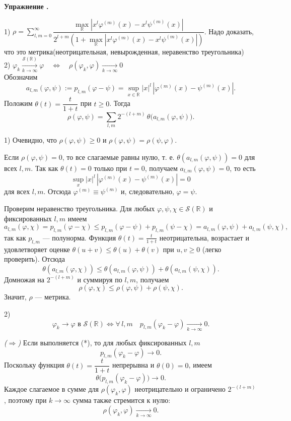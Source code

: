 \documentclass[11pt,a4paper]{report}
\numberwithin{equation}{section}
\numberwithin{figure}{chapter}
\numberwithin{table}{chapter}
\newif\ifinmathphysstatement
\newenvironment{myexe}[1][]{%
    \refstepcounter{exectr}%
    \inmathphysstatementtrue
    \begin{tcolorbox}[mathphysblock,colframe=exercisecolor,colback=exercisecolor!3,#1]
    \textbf{\color{exercisecolor}Упражнение \theexectr.}\par\smallskip
}{%
    \end{tcolorbox}
    \inmathphysstatementfalse
}
\newcommand{\R}{\mathbb{R}}
\newcommand{\SR}{\mathcal{S}(\R)}
\renewcommand{\phi}{\varphi}
\begin{document}
\begin{myexe} 
    1) $\rho=\displaystyle\sum\limits_{l,m=0}^{\infty}\dfrac{\underset{\R}{\max}|x^l\phi^{(m)}(x)-x^l\psi^{(m)}(x)|}{2^{l+m}(1+\underset{\R}{\max}|x^l\phi^{(m)}(x)-x^l\psi^{(m)}(x)|)}$. Надо доказать, что это метрика(неотрицательная, невырожденная, неравенство треугольника) \\
    2) $\phi_k\xrightarrow[k\to\infty]{\SR}\phi \quad \Leftrightarrow \quad \rho(\phi_k, \phi) \xrightarrow[k\to\infty]{}0$
\\
Обозначим
\[
a_{l,m}(\varphi,\psi)
:=p_{l,m}(\varphi-\psi)
=\sup_{x\in\mathbb R}|x|^l\,|\varphi^{(m)}(x)-\psi^{(m)}(x)|.
\]
Положим $\theta(t)=\dfrac{t}{1+t}$ при $t\ge0$.
Тогда
\[
\rho(\varphi,\psi)
=
\sum_{l,m}2^{-(l+m)}\,\theta\bigl(a_{l,m}(\varphi,\psi)\bigr).
\]

1)
Очевидно, что $\rho(\varphi,\psi)\ge0$ и
$\rho(\varphi,\psi)=\rho(\psi,\varphi)$.

Если $\rho(\varphi,\psi)=0$, то все слагаемые равны нулю, т. е.
$\theta(a_{l,m}(\varphi,\psi))=0$ для всех $l,m$. Так как $\theta(t)=0$
только при $t=0$, получаем $a_{l,m}(\varphi,\psi)=0$, то есть
\[
\sup_x |x|^l\,|\varphi^{(m)}(x)-\psi^{(m)}(x)|=0
\]
для всех $l,m$. Отсюда $\varphi^{(m)}\equiv\psi^{(m)}$ и, следовательно,
$\varphi=\psi$.

Проверим неравенство треугольника. Для любых
$\varphi,\psi,\chi\in \SR$ и фиксированных $l,m$ имеем
\[
a_{l,m}(\varphi,\chi)
=p_{l,m}(\varphi-\chi)
\le p_{l,m}(\varphi-\psi)+p_{l,m}(\psi-\chi)
=a_{l,m}(\varphi,\psi)+a_{l,m}(\psi,\chi),
\]
так как $p_{l,m}$ --- полунорма.
Функция $\theta(t)=\frac{t}{1+t}$ неотрицательна, возрастает и удовлетворяет
оценке $\theta(u+v)\le\theta(u)+\theta(v)$ при $u,v\ge0$ (легко проверить).
Отсюда
\[
\theta(a_{l,m}(\varphi,\chi))
\le
\theta(a_{l,m}(\varphi,\psi))
+
\theta(a_{l,m}(\psi,\chi)).
\]
Домножая на $2^{-(l+m)}$ и суммируя по $l,m$, получаем
\[
\rho(\varphi,\chi)\le\rho(\varphi,\psi)+\rho(\psi,\chi).
\]
Значит, $\rho$ --- метрика.

\medskip

2) 
\[
\varphi_k\to\varphi \text{ в } \SR
\iff
\forall\,l,m\quad p_{l,m}(\varphi_k-\varphi)\xrightarrow[k\to\infty]{}0.
\tag{*}
\]

\emph{($\Rightarrow$)} Если выполняется (*), то для любых фиксированных $l,m$
\[
p_{l,m}(\varphi_k-\varphi)\to0.
\]
Поскольку функция $\theta(t)=\dfrac{t}{1+t}$ непрерывна и $\theta(0)=0$,
имеем
\[
\theta\bigl(p_{l,m}(\varphi_k-\varphi)\bigr)\to0.
\]
Каждое слагаемое в сумме для $\rho(\varphi_k,\varphi)$ неотрицательно и
ограничено $2^{-(l+m)}$, поэтому при $k\to\infty$ сумма также стремится к
нулю:
\[
\rho(\varphi_k,\varphi)\xrightarrow[k\to\infty]{}0.
\]


\end{myexe}
\end{document}
